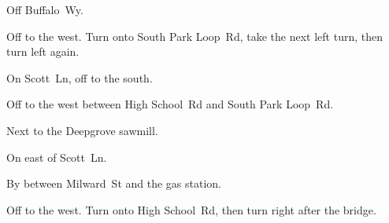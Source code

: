 
\begin{LocationList}

Off  Buffalo~Wy.

Off  to the west.
Turn onto South Park Loop~Rd, take the next left turn, then turn left again.

On Scott~Ln, off  to the south.

Off  to the west between High School~Rd and South Park Loop~Rd.

\Location{\GarageHQ \Garage}
Next to the Deepgrove sawmill.

\Location{\GasStation \Gas}
On  east of Scott~Ln.

By  between Milward~St and the gas station.

Off  to the west.
Turn onto High School~Rd, then turn right after the bridge.

\end{LocationList}

